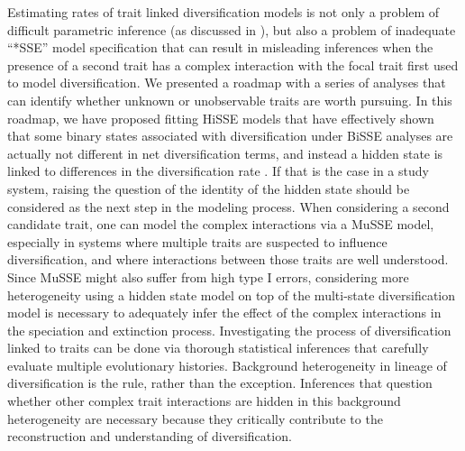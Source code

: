 Estimating rates of trait linked diversification models is not only a problem of difficult parametric inference (as discussed in \citealt{rabosky_2010, beaulieu_2015}), but also a problem of inadequate ``*SSE'' model specification that can result in misleading inferences when the presence of a second trait has a complex interaction with the focal trait first used to model diversification. 
We presented a roadmap with a series of analyses that can identify whether unknown or unobservable traits are worth pursuing. 
In this roadmap, we have proposed fitting HiSSE models that have effectively shown that some binary states associated with diversification under BiSSE analyses are actually not different in net diversification terms, and instead a hidden state is linked to differences in the diversification rate \citep{beaulieu_2016}.  
If that is the case in a study system, raising the question of the identity of the hidden state should be considered as the next step in the modeling process.  %
When considering a second candidate trait, one can model the complex interactions via a MuSSE model, especially in systems where multiple traits are suspected to influence diversification, and where interactions between those traits are well understood. 
Since MuSSE might also suffer from high type I errors, considering more heterogeneity using a hidden state model on top of the multi-state diversification model is necessary to adequately infer the effect of the complex interactions in the speciation and extinction process.
Investigating the process of diversification linked to traits can be done via thorough statistical inferences that carefully evaluate multiple evolutionary histories. 
Background heterogeneity in lineage of diversification is the rule, rather than the exception. 
Inferences that question whether other complex trait interactions are hidden in this background heterogeneity are necessary because they critically contribute to the reconstruction and understanding of diversification. 
